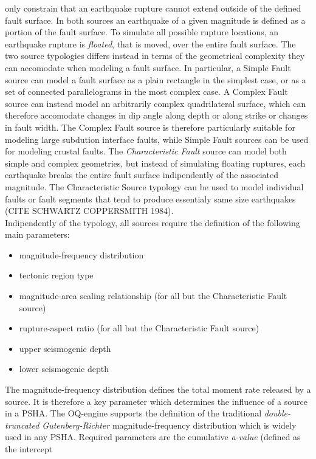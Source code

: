 only constrain that an earthquake rupture cannot extend outside of the defined fault surface. In both sources an earthquake of a given magnitude is defined as a portion of the fault surface. To simulate all possible rupture locations, an earthquake rupture is \textit{floated}, that is moved, over the entire fault surface. The two source typologies differs instead in terms of the geometrical complexity they can accomodate when modeling a fault surface. In particular, a Simple Fault source can model a fault surface as a plain rectangle in the simplest case, or as a set of connected parallelograms in the most complex case. A Complex Fault source can instead model an arbitrarily complex quadrilateral surface, which can therefore accomodate changes in dip angle along depth or along strike or changes in fault width. The Complex Fault source is therefore particularly suitable for modeling large subdution interface faults, while Simple Fault sources can be used for modeling crustal faults. The \textit{Characteristic Fault} source can model both simple and complex geometries, but instead of simulating floating ruptures, each earthquake breaks the entire fault surface indipendently of the associated magnitude. The Characteristic Source typology can be used to model individual faults or fault segments that tend to produce essentialy same size earthquakes (CITE SCHWARTZ COPPERSMITH 1984).\\
Indipendently of the typology, all sources require the definition of the following main parameters:
\begin{itemize}
\item magnitude-frequency distribution
\item tectonic region type
\item magnitude-area scaling relationship (for all but the Characteristic Fault source)
\item rupture-aspect ratio (for all but the Characteristic Fault source)
\item upper seismogenic depth
\item lower seismogenic depth
\end{itemize}
The magnitude-frequency distribution defines the total moment rate released by a source. It is therefore a
key parameter which determines the influence of a source in a PSHA. The OQ-engine supports the definition
of the traditional \textit{double-truncated Gutenberg-Richter} magnitude-frequency distribution which is
widely used in any PSHA. Required parameters are the cumulative \textit{a-value} (defined as the intercept
